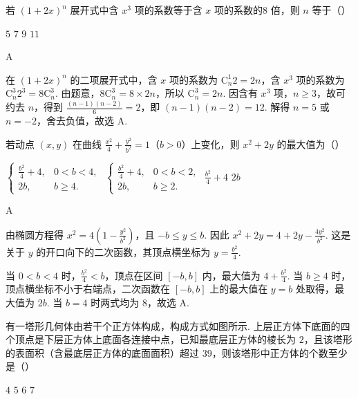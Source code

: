 \begin{problem}
若 \((1 + 2x)^{n}\) 展开式中含 \(x^{3}\) 项的系数等于含 \(x\) 项的系数的\(8\) 倍，则 \(n\) 等于（\quad）

\choices
    {\(5\)}
    {\(7\)}
    {\(9\)}
    {\(11\)}
\end{problem}

\begin{answer}
A
\end{answer}

\begin{solution}
在 \((1+2x)^n\) 的二项展开式中，含 \(x\) 项的系数为 \(\mathrm C_n^1 2=2n\)，含 \(x^3\) 项的系数为 \(\mathrm C_n^3 2^3=8\mathrm C_n^3\). 由题意，\(8\mathrm C_n^3=8\times2n\)，所以 \(\mathrm C_n^3=2n\). 因含有 \(x^3\) 项，\(n\geqslant3\)，故可约去 \(n\)，得到 \(\frac{(n-1)(n-2)}{6}=2\)，即 \((n-1)(n-2)=12\). 解得 \(n=5\) 或 \(n=-2\)，舍去负值，故选 A.
\end{solution}

\begin{problem}
若动点 \((x, y)\) 在曲线 \(\frac{x^2}{4} + \frac{y^2}{b^2} = 1\)（\(b > 0\)）上变化，则 \(x^2 + 2y\) 的最大值为（\quad）

\choices
    {\(\begin{cases}
\frac{b^2}{4} +4, & 0 < b < 4,\\
2b, & b\geqslant 4.
\end{cases}\)}
    {\(\begin{cases}
\frac{b^2}{4} +4, & 0 < b < 2,\\
2b, & b\geqslant 2.
\end{cases}\)}
    {\(\frac{b^2}{4} + 4\)}
    {\(2b\)}
\end{problem}

\begin{answer}
A
\end{answer}

\begin{solution}
由椭圆方程得 \(x^2=4\left(1-\frac{y^2}{b^2}\right)\)，且 \(-b\leqslant y\leqslant b\). 因此 \(x^2+2y=4+2y-\frac{4y^2}{b^2}\). 这是关于 \(y\) 的开口向下的二次函数，其顶点横坐标为 \(y=\frac{b^2}{4}\).

当 \(0<b<4\) 时，\(\frac{b^2}{4}<b\)，顶点在区间 \([-b,b]\) 内，最大值为 \(4+\frac{b^2}{4}\). 当 \(b\geqslant4\) 时，顶点横坐标不小于右端点，二次函数在 \([-b,b]\) 上的最大值在 \(y=b\) 处取得，最大值为 \(2b\). 当 \(b=4\) 时两式均为 \(8\)，故选 A.
\end{solution}

\begin{problem}
有一塔形几何体由若干个正方体构成，构成方式如图所示. 上层正方体下底面的四个顶点是下层正方体上底面各连接中点，已知最底层正方体的棱长为 \(2\)，且该塔形的表面积（含最底层正方体的底面面积）超过 \(39\)，则该塔形中正方体的个数至少是（\quad）


\choices
    {\(4\)}
    {\(5\)}
    {\(6\)}
    {\(7\)}
\end{problem}

